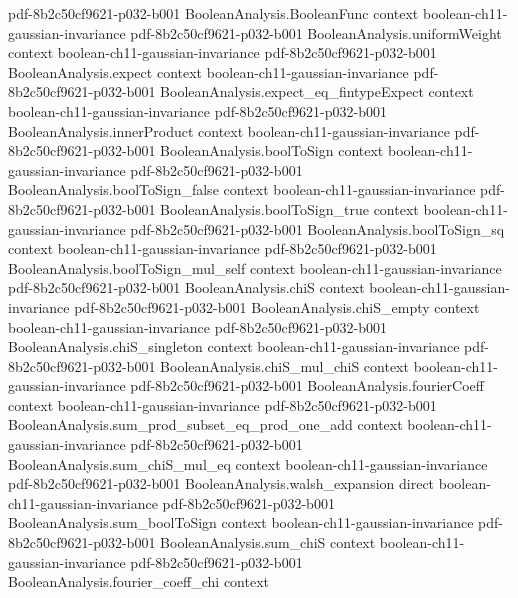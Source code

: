 \begin{lemma}
  {pdf-8b2c50cf9621-p032-b001}
\proofstep
  {BooleanAnalysis.BooleanFunc}
  {context}
  {boolean-ch11-gaussian-invariance}
  {pdf-8b2c50cf9621-p032-b001}
\proofstep
  {BooleanAnalysis.uniformWeight}
  {context}
  {boolean-ch11-gaussian-invariance}
  {pdf-8b2c50cf9621-p032-b001}
\proofstep
  {BooleanAnalysis.expect}
  {context}
  {boolean-ch11-gaussian-invariance}
  {pdf-8b2c50cf9621-p032-b001}
\proofstep
  {BooleanAnalysis.expect_eq_fintypeExpect}
  {context}
  {boolean-ch11-gaussian-invariance}
  {pdf-8b2c50cf9621-p032-b001}
\proofstep
  {BooleanAnalysis.innerProduct}
  {context}
  {boolean-ch11-gaussian-invariance}
  {pdf-8b2c50cf9621-p032-b001}
\proofstep
  {BooleanAnalysis.boolToSign}
  {context}
  {boolean-ch11-gaussian-invariance}
  {pdf-8b2c50cf9621-p032-b001}
\proofstep
  {BooleanAnalysis.boolToSign_false}
  {context}
  {boolean-ch11-gaussian-invariance}
  {pdf-8b2c50cf9621-p032-b001}
\proofstep
  {BooleanAnalysis.boolToSign_true}
  {context}
  {boolean-ch11-gaussian-invariance}
  {pdf-8b2c50cf9621-p032-b001}
\proofstep
  {BooleanAnalysis.boolToSign_sq}
  {context}
  {boolean-ch11-gaussian-invariance}
  {pdf-8b2c50cf9621-p032-b001}
\proofstep
  {BooleanAnalysis.boolToSign_mul_self}
  {context}
  {boolean-ch11-gaussian-invariance}
  {pdf-8b2c50cf9621-p032-b001}
\proofstep
  {BooleanAnalysis.chiS}
  {context}
  {boolean-ch11-gaussian-invariance}
  {pdf-8b2c50cf9621-p032-b001}
\proofstep
  {BooleanAnalysis.chiS_empty}
  {context}
  {boolean-ch11-gaussian-invariance}
  {pdf-8b2c50cf9621-p032-b001}
\proofstep
  {BooleanAnalysis.chiS_singleton}
  {context}
  {boolean-ch11-gaussian-invariance}
  {pdf-8b2c50cf9621-p032-b001}
\proofstep
  {BooleanAnalysis.chiS_mul_chiS}
  {context}
  {boolean-ch11-gaussian-invariance}
  {pdf-8b2c50cf9621-p032-b001}
\proofstep
  {BooleanAnalysis.fourierCoeff}
  {context}
  {boolean-ch11-gaussian-invariance}
  {pdf-8b2c50cf9621-p032-b001}
\proofstep
  {BooleanAnalysis.sum_prod_subset_eq_prod_one_add}
  {context}
  {boolean-ch11-gaussian-invariance}
  {pdf-8b2c50cf9621-p032-b001}
\proofstep
  {BooleanAnalysis.sum_chiS_mul_eq}
  {context}
  {boolean-ch11-gaussian-invariance}
  {pdf-8b2c50cf9621-p032-b001}
\proofstep
  {BooleanAnalysis.walsh_expansion}
  {direct}
  {boolean-ch11-gaussian-invariance}
  {pdf-8b2c50cf9621-p032-b001}
\proofstep
  {BooleanAnalysis.sum_boolToSign}
  {context}
  {boolean-ch11-gaussian-invariance}
  {pdf-8b2c50cf9621-p032-b001}
\proofstep
  {BooleanAnalysis.sum_chiS}
  {context}
  {boolean-ch11-gaussian-invariance}
  {pdf-8b2c50cf9621-p032-b001}
\proofstep
  {BooleanAnalysis.fourier_coeff_chi}
  {context}

\end{lemma}
